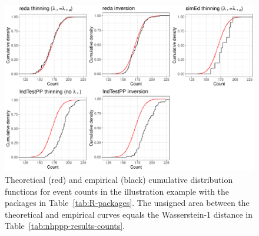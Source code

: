 \documentclass[article,nojss]{jss}\usepackage[]{graphicx}\usepackage[]{xcolor}
\makeatletter
\def\maxwidth{ %
  \ifdim\Gin@nat@width>\linewidth
    \linewidth
  \else
    \Gin@nat@width
  \fi
}
\newenvironment{knitrout}{}{} %
\makeatother
\begin{document}
\begin{knitrout}
\color{fgcolor}\begin{figure}
\includegraphics[width=\maxwidth]{figure/r-pkgs-pkg-counts-1} \caption{Theoretical (red) and empirical (black) cumulative distribution functions for event counts in the illustration example with the  packages in Table~\ref{tab:R-packages}. The unsigned area between the theoretical and empirical curves equals the Wasserstein-1 distance in Table~\ref{tab:nhppp-results-counts}.}\label{fig:r-pkgs-pkg-counts}
\end{figure}

\end{knitrout}
\end{document}
